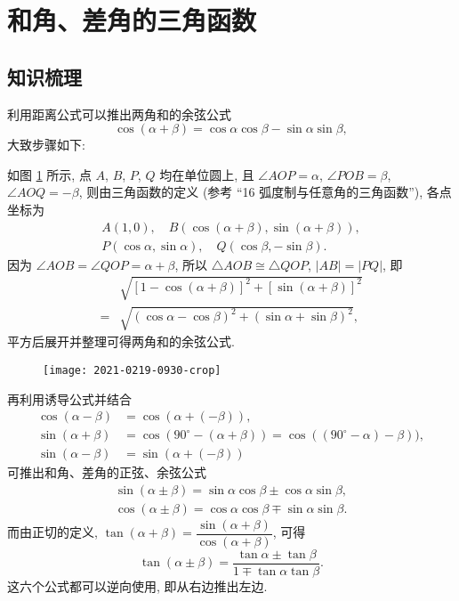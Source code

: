 \section{和角、差角的三角函数}

\subsection{知识梳理}
利用距离公式可以推出两角和的余弦公式
\[\cos(\alpha+\beta)= \cos\alpha\cos\beta- \sin\alpha\sin\beta,\]
大致步骤如下:

如图 \ref{fig:2021-0219-0930} 所示, 点 $A$, $B$, $P$, $Q$ 均在单位圆上, 且 $\angle AOP=\alpha$, $\angle POB=\beta$, $\angle AOQ=-\beta$, 则由三角函数的定义 (参考 ``16 弧度制与任意角的三角函数''), 各点坐标为
\[\begin{gathered}
    A(1,0),\quad
    B(\cos(\alpha+\beta),\sin(\alpha+\beta)),\\
    P(\cos\alpha,\sin\alpha),\quad
    Q(\cos\beta,-\sin\beta).
\end{gathered}\]
因为 $\angle AOB= \angle QOP= \alpha+\beta$, 所以 $\triangle AOB\cong \triangle QOP$, $|AB|=|PQ|$, 即
\[\begin{aligned}
    &\sqrt{[1-\cos(\alpha+\beta)]^2+[\sin(\alpha+\beta)]^2}\\
    ={}& \sqrt{(\cos\alpha- \cos\beta)^2+ (\sin\alpha+ \sin\beta)^2},
\end{aligned}\]
平方后展开并整理可得两角和的余弦公式.

\begin{figure}[hb]
    \centering
    \texttt{[image: 2021-0219-0930-crop]}
    \caption{}\label{fig:2021-0219-0930}
\end{figure}

再利用诱导公式并结合
\[\begin{aligned}
    \cos(\alpha-\beta)&= \cos(\alpha+(-\beta)),\\
    \sin(\alpha+\beta)&= \cos(90^\circ-(\alpha+\beta))
        = \cos((90^\circ-\alpha)-\beta)),\\
    \sin(\alpha-\beta)&= \sin(\alpha+(-\beta))
\end{aligned}\]
可推出和角、差角的正弦、余弦公式
\begin{gather*}
    \sin(\alpha\pm \beta)= \sin\alpha\cos\beta\pm \cos\alpha\sin\beta,\\
    \cos(\alpha\pm \beta)= \cos\alpha\cos\beta\mp \sin\alpha\sin\beta.  
\end{gather*}
而由正切的定义, $\tan(\alpha+\beta)= \dfrac{\sin(\alpha+\beta)}{\cos(\alpha+\beta)}$, 可得
\[\tan(\alpha\pm \beta)
    = \frac{\tan\alpha\pm \tan\beta}{1\mp \tan\alpha\tan\beta}.\]
这六个公式都可以逆向使用, 即从右边推出左边.

